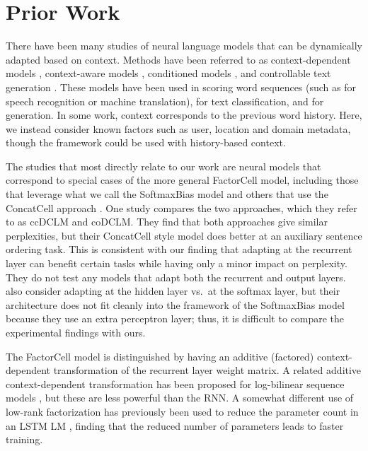 \section{Prior Work}
\label{sec:prior}

There have been many studies of neural language models that can be dynamically adapted based on context.  Methods have been referred to as context-dependent models \cite{mikolov2012context}, context-aware models \cite{TangContextAware},  conditioned models \cite{Ficler2017ControllingLS}, and controllable text generation \cite{Hu2017ControllableTG}. These models have been used in scoring word sequences (such as for speech recognition or machine translation), for text classification, and for generation. In some work, context corresponds to the previous word history. Here, we instead consider known factors such as user, location and domain metadata, though the framework could be used with history-based context.

The studies that most directly relate to our work are neural models that correspond to special cases of the more general FactorCell model, including those that leverage what we call the SoftmaxBias model \cite{dieng2016topicrnn,TangContextAware,Yogatama2017GenerativeAD,Ficler2017ControllingLS} and others that use the ConcatCell approach \cite{mikolov2012context,wen2013recurrent,chen2015recurrent,ghosh2016contextual}. One study \cite{Ji2015DocumentCL} compares the two approaches, which they refer to as ccDCLM and coDCLM. They find that both approaches give similar perplexities,
but their ConcatCell style model does better at an auxiliary sentence ordering task. This is consistent with our finding that adapting at the recurrent layer can benefit certain tasks while having only a minor impact on perplexity. They do not test any models that adapt both the recurrent and output layers.
 also consider adapting at the hidden layer vs.\ at the softmax layer, but their architecture does not fit cleanly into the framework of the SoftmaxBias model because they use an extra perceptron layer; thus, it is difficult to compare the experimental findings with ours.

The FactorCell model is distinguished by having an additive (factored) context-dependent transformation of the recurrent layer weight matrix. A related additive context-dependent transformation has been proposed for log-bilinear sequence models \cite{Eisenstein+11,Hutchinson+15}, but these are less powerful than the RNN. A somewhat different use of low-rank factorization has previously been used to reduce the parameter count in an LSTM LM \cite{Kuchaiev2017FactorizationTF}, finding that the reduced number of parameters leads to faster training.

